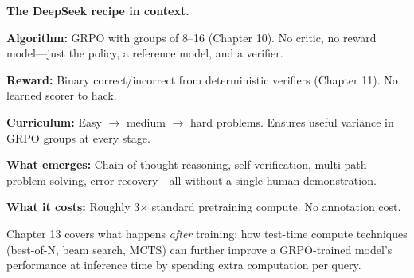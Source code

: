 \begin{chapterenv}
\begin{infobox}
\textbf{The DeepSeek recipe in context.}

\textbf{Algorithm:} GRPO with groups of 8--16 (Chapter 10). No critic, no reward model---just the policy, a reference model, and a verifier.

\textbf{Reward:} Binary correct/incorrect from deterministic verifiers (Chapter 11). No learned scorer to hack.

\textbf{Curriculum:} Easy $\to$ medium $\to$ hard problems. Ensures useful variance in GRPO groups at every stage.

\textbf{What emerges:} Chain-of-thought reasoning, self-verification, multi-path problem solving, error recovery---all without a single human demonstration.

\textbf{What it costs:} Roughly 3$\times$ standard pretraining compute. No annotation cost.

Chapter 13 covers what happens \textit{after} training: how test-time compute techniques (best-of-N, beam search, MCTS) can further improve a GRPO-trained model's performance at inference time by spending extra computation per query.
\end{infobox}

\end{chapterenv}